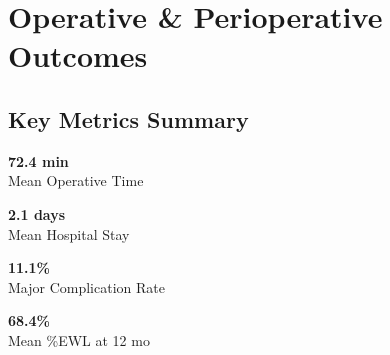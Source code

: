 \documentclass[11pt,a4paper]{article}
\begin{document}
\section{Operative \& Perioperative Outcomes}

\subsection{Key Metrics Summary}

\vspace{4pt}
\begin{minipage}[t]{0.23\textwidth}
  \begin{tcolorbox}[statbox]
    {\color{SurgGold}\large\bfseries 72.4 min}\\[2pt]
    {\color{white!80!SurgBlue}\scriptsize Mean Operative Time}
  \end{tcolorbox}
\end{minipage}%
\hfill%
\begin{minipage}[t]{0.23\textwidth}
  \begin{tcolorbox}[statbox]
    {\color{SurgGold}\large\bfseries 2.1 days}\\[2pt]
    {\color{white!80!SurgBlue}\scriptsize Mean Hospital Stay}
  \end{tcolorbox}
\end{minipage}%
\hfill%
\begin{minipage}[t]{0.23\textwidth}
  \begin{tcolorbox}[statbox]
    {\color{SurgGold}\large\bfseries 11.1\%}\\[2pt]
    {\color{white!80!SurgBlue}\scriptsize Major Complication Rate}
  \end{tcolorbox}
\end{minipage}%
\hfill%
\begin{minipage}[t]{0.23\textwidth}
  \begin{tcolorbox}[statbox]
    {\color{SurgGold}\large\bfseries 68.4\%}\\[2pt]
    {\color{white!80!SurgBlue}\scriptsize Mean \%EWL at 12 mo}
  \end{tcolorbox}
\end{minipage}

\vspace{10pt}
\end{document}
